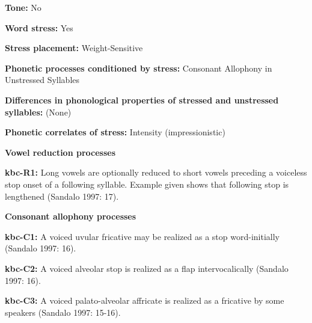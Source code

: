 \begin{styleBody}
\textbf{Tone:} No
\end{styleBody}

\begin{styleBody}
\textbf{Word stress:} Yes
\end{styleBody}

\begin{styleBody}
\textbf{Stress placement:} Weight-Sensitive
\end{styleBody}

\begin{styleBody}
\textbf{Phonetic processes conditioned by stress:} Consonant Allophony in Unstressed Syllables
\end{styleBody}

\begin{styleBody}
\textbf{Differences in phonological properties of stressed and unstressed syllables:} (None)
\end{styleBody}

\begin{styleBody}
\textbf{Phonetic correlates of stress: }Intensity (impressionistic)
\end{styleBody}

\begin{styleBody}
\textbf{Vowel reduction processes}
\end{styleBody}

\begin{styleBody}
\textbf{kbc-R1:} Long vowels are optionally reduced to short vowels preceding a voiceless stop onset of a following syllable. Example given shows that following stop is lengthened (Sandalo 1997: 17).
\end{styleBody}

\begin{styleBody}
\textbf{Consonant allophony processes}
\end{styleBody}

\begin{styleBody}
\textbf{kbc-C1: }A voiced uvular fricative may be realized as a stop word-initially (Sandalo 1997: 16).
\end{styleBody}

\begin{styleBody}
\textbf{kbc-C2: }A voiced alveolar stop is realized as a flap intervocalically (Sandalo 1997: 16).
\end{styleBody}

\begin{styleBody}
\textbf{kbc-C3: }A voiced palato-alveolar affricate is realized as a fricative by some speakers (Sandalo 1997: 15-16).
\end{styleBody}

